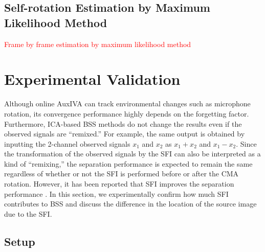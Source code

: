 \documentclass[sip,biber]{now-journal}
\newcommand{\todo}[1]{\textcolor{red}{#1}}
\begin{document}
\subsection{Self-rotation Estimation by Maximum Likelihood Method}

\todo{%
Frame by frame estimation by maximum likelihood method \cite{Lian:2021:APSIPA}
}

\section{Experimental Validation}\label{sec:experiment}

Although online AuxIVA can track environmental changes such as microphone rotation, its convergence performance highly depends on the forgetting factor.
Furthermore, ICA-based BSS methods do not change the results even if the observed signals are ``remixed.''
For example, the same output is obtained by inputting the 2-channel observed signals $x_1$ and $x_2$ as $x_1 + x_2$ and $x_1 - x_2$.
Since the transformation of the observed signals by the SFI can also be interpreted as a kind of ``remixing,''
the separation performance is expected to remain the same regardless of whether or not the SFI is performed before or after the CMA rotation.
However, it has been reported that SFI improves the separation performance \cite{Nakashima:2022:ASJ:A}.
In this section, we experimentally confirm how much SFI contributes to BSS and discuss the difference in the location of the source image due to the SFI.

\subsection{Setup}
\end{document}
